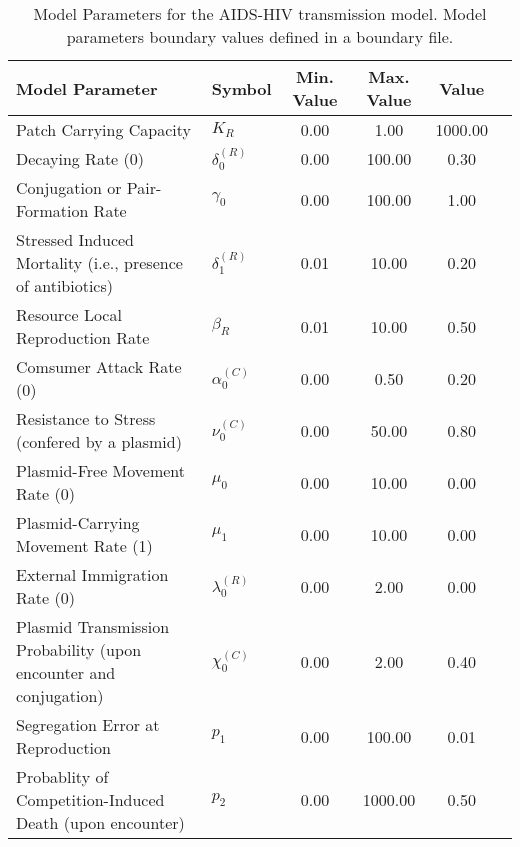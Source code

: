 \begin{table}
\centering
\begin{tabular}{p{5cm}lcccc}
{\bf Model Parameter} & {\bf Symbol} & {\bf Min. Value} & {\bf Max. Value} & {\bf Value}\\
\hline\hline
Patch Carrying Capacity & $K_R$ & 0.00 & 1.00 & 1000.00\\
Decaying Rate (0) & $\delta^{(R)}_0$ & 0.00 & 100.00 & 0.30\\
Conjugation or Pair-Formation Rate & $\gamma_0$ & 0.00 & 100.00 & 1.00\\
Stressed Induced Mortality (i.e., presence of antibiotics) & $\delta^{(R)}_1$ & 0.01 & 10.00 & 0.20\\
Resource Local Reproduction Rate & $\beta_R$ & 0.01 & 10.00 & 0.50\\
Comsumer Attack Rate (0) & $\alpha^{(C)}_0$ & 0.00 & 0.50 & 0.20\\
Resistance to Stress (confered by a plasmid) & $\nu^{(C)}_0$ & 0.00 & 50.00 & 0.80\\
Plasmid-Free Movement Rate (0) & $\mu_0$ & 0.00 & 10.00 & 0.00\\
Plasmid-Carrying Movement Rate (1) & $\mu_1$ & 0.00 & 10.00 & 0.00\\
External Immigration Rate (0) & $\lambda^{(R)}_0$ & 0.00 & 2.00 & 0.00\\
Plasmid Transmission Probability (upon encounter and conjugation) & $\chi^{(C)}_0$ & 0.00 & 2.00 & 0.40\\
Segregation Error at Reproduction & $p_1$ & 0.00 & 100.00 & 0.01\\
Probablity of Competition-Induced Death (upon encounter) & $p_2$ & 0.00 & 1000.00 & 0.50\\
\hline\hline
\end{tabular}
\caption{Model Parameters for the AIDS-HIV transmission model. Model parameters boundary values defined in a boundary file.}
\end{table}
